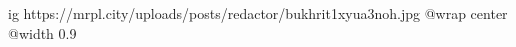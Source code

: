  
 
 
 
 

\ifcmt
  ig https://mrpl.city/uploads/posts/redactor/bukhrit1xyua3noh.jpg
  @wrap center
  @width 0.9
\fi
